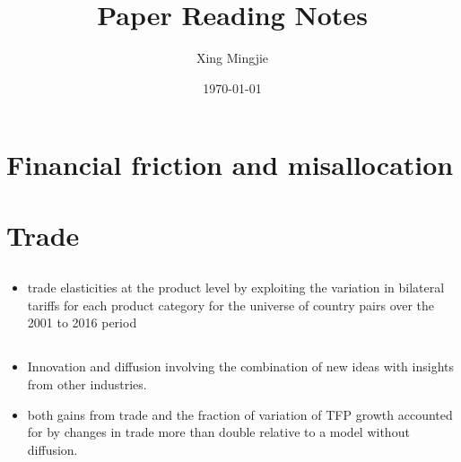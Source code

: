 \documentclass[10pt]{article} %
\title{Paper Reading Notes}
\author{Xing Mingjie}
\date{\today} %
\begin{document}
\maketitle

\tableofcontents

\newpage

\section{Financial friction and misallocation}

    \subsection{\cite{Kaboski2023}}

    \subsection{\cite{HsiehKlenow2014}}

    \subsection{\cite{BueraKaboskiShin2011}}

    \subsection{\cite{Cavalcantietal2021}}

    \subsection{\cite{MidriganXu2014}}

\section{Trade}

    \subsection{\cite{FontagneGuimbardOrefice2022}}
    \begin{itemize}
        \item trade elasticities at the product level by exploiting the variation in bilateral tariffs for each product category for the universe of country pairs over the 2001 to 2016 period
    \end{itemize}

    \subsection{\cite{BueraOberfield2020}}
    \begin{itemize}
        \item Innovation and diffusion involving the combination of new ideas with insights from other industries.
        \item both gains from trade and the fraction of variation of TFP growth accounted for by changes in trade more than double relative to a model without diffusion.
    \end{itemize}
\end{document}

